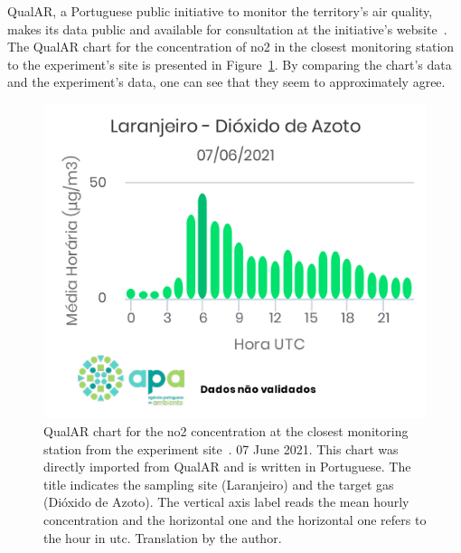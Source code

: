 QualAR, a Portuguese public initiative to monitor the territory's air
quality, makes its data public and available for consultation at the
initiative's website~\cite{Ambiente2019}. The QualAR chart for the
concentration of \gls{no2} in the closest monitoring station to the
experiment's site is presented in Figure~\ref{fig:qualar_0706}. By
comparing the chart's data and the experiment's data, one can see that
they seem to approximately agree.

\begin{figure}[htpb]
    \centering
    \includegraphics[width=.8\textwidth]{img/pdf/no2_07jun_apa_chart.pdf}
    \caption{QualAR chart for the \gls{no2} concentration at
    the closest monitoring station from the experiment
    site~\cite{Ambiente2019}. 07 June 2021. This chart was directly
    imported from QualAR and is written in Portuguese. The title indicates
    the sampling site (Laranjeiro) and the target gas (Dióxido de Azoto).
    The vertical axis label reads the mean hourly concentration and the
    horizontal one and the horizontal one refers to the hour in \gls{utc}.
    Translation by the author.}
    \label{fig:qualar_0706}
\end{figure}

